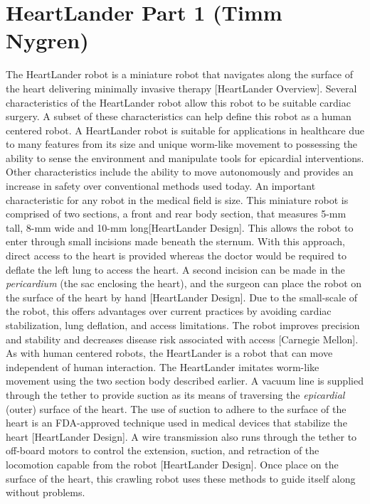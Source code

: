 \documentclass[11pt,conference]{IEEEtran}
\begin{document}
\section{ HeartLander Part 1 (Timm Nygren)}

\indent The HeartLander robot is a miniature robot that navigates along the surface of the heart delivering minimally invasive therapy [HeartLander Overview]. Several characteristics of the HeartLander robot allow this robot to be suitable cardiac surgery. A subset of these characteristics can help define this robot as a human centered robot. A HeartLander robot is suitable for applications in healthcare due to many features from its size and unique worm-like movement to possessing the ability to sense the environment and manipulate tools for epicardial interventions. Other characteristics include the ability to move autonomously and provides an increase in safety over conventional methods used today.
\newline
\indent An important characteristic for any robot in the medical field is size. This  miniature robot is comprised of two sections, a front and rear body section, that measures 5-mm tall, 8-mm wide and 10-mm long[HeartLander Design]. This allows the robot to enter through small incisions made beneath the sternum. With this approach, direct access to the heart is provided whereas the doctor would be required to deflate the left lung to access the heart. A second incision can be made in the \textit{pericardium} (the sac enclosing the heart), and the surgeon can place the robot on the surface of the heart by hand [HeartLander Design]. Due to the small-scale of the robot, this offers advantages over current practices by avoiding cardiac stabilization, lung deflation, and access limitations. The robot improves precision and stability and decreases disease risk associated with access [Carnegie Mellon].
\newline
\indent As with human centered robots, the HeartLander is a robot that can move independent of human interaction. The HeartLander imitates worm-like movement using the two section body described earlier. A vacuum line is supplied through the tether to provide suction as its means of traversing the \textit{epicardial} (outer) surface of the heart. The use of suction to adhere to the surface of the heart is an FDA-approved technique used in medical devices that stabilize the heart [HeartLander Design]. A wire transmission also runs through the tether to off-board motors to control the extension, suction, and retraction of the locomotion capable from the robot [HeartLander Design]. Once place on the surface of the heart, this crawling robot uses these methods to guide itself along without problems.
\end{document}
